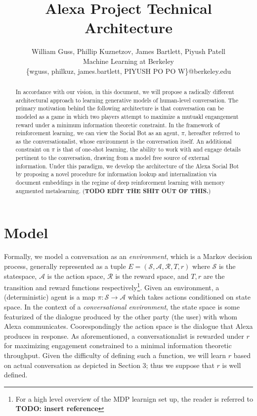 \documentclass{article} %
\title{Alexa Project Technical Architecture}
\author{William Guss, Phillip Kuznetzov, James Bartlett, Piyush Patell\\
Machine Learning at Berkeley\\
\{wguss, philkuz, james.bartlett, PIYUSH PO PO W\}@berkeley.edu}
\numberwithin{equation}{subsection}
\numberwithin{theorem}{subsection}
\theoremstyle{named}
\def\scripta{{\mathcal A}}
\def\scriptr{{\mathcal R}}
\def\scripts{{\mathcal S}}
\begin{document}
\maketitle

\begin{abstract}
In accordance with our vision, in this document, we will propose a radically different architectural approach to learning generative models of human-level conversation. The primary motivation behind the following architecture is that conversation can be modeled as a game in which two players attempt to maximize a mutuakl engangement reward under a minimum information theoretic constraint. In the framework of reinforcement learning, we can view the Social Bot as an agent, $\pi$, hereafter referred to as the conversationalist, whose environment is the conversation itself. An additional constraint on $\pi$ is that of one-shot learning, the ability to work with and engage details pertinent to the conversation, drawing from a model free source of external information. Under this paradigm, we develop the architecture of the Alexa Social Bot by proposing a novel procedure for information lookup and internalization via document embeddings in the regime of deep reinforcement learning with memory augmented metalearning. (\textbf{TODO EDIT THE SHIT OUT OF THIS.})
\end{abstract}

\section{Model}

Formally, we model a conversation as an \emph{environment}, which is a Markov decision process, generally represented as a tuple $E=(\scripts, \scripta, \scriptr, T, r)$ where $\scripts$ is the statespace, $\scripta$ is the action space, $\scriptr$ is the reward space, and $T, r$ are the transition and reward functions respectively\footnote{For a high level overview of the MDP learnign set up, the reader is referred to \textbf{ TODO: insert reference}}. Given an environment, a (deterministic) agent is a map $\pi: \scripts \to \scripta$ which takes actions conditioned on state space. In the context of a \emph{conversational environment}, the state space is some featurized of the dialogue produced by the other party (the user) with whom Alexa communicates. Coorespondingly the action space is the dialogue that Alexa produces in response. As aforementioned, a conversationalist is rewarded under $r$ for maximizing engagement constrained to a minimal information theoretic throughput. Given the difficulty of defining such a function, we will learn $r$ based on actual conversation as depicted in Section 3; thus we suppose that $r$ is well defined.
\end{document}
